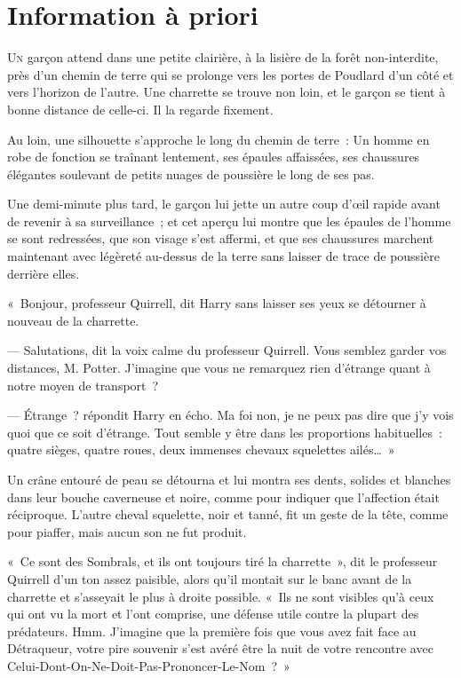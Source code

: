 \chapter{Information à priori}

\lettrine{U}{n} garçon attend dans une petite clairière, à la lisière de la forêt non-interdite, près d'un chemin de terre qui se prolonge vers les portes de Poudlard d'un côté et vers l'horizon de l'autre.
Une charrette se trouve non loin, et le garçon se tient à bonne distance de celle-ci.
Il la regarde fixement.

Au loin, une silhouette s'approche le long du chemin de terre~: Un homme en robe de fonction se traînant lentement, ses épaules affaissées, ses chaussures élégantes soulevant de petits nuages de poussière le long de ses pas.

Une demi-minute plus tard, le garçon lui jette un autre coup d'œil rapide avant de revenir à sa surveillance~; et cet aperçu lui montre que les épaules de l'homme se sont redressées, que son visage s'est affermi, et que ses chaussures marchent maintenant avec légèreté au-dessus de la terre sans laisser de trace de poussière derrière elles.

«~Bonjour, professeur Quirrell, dit Harry sans laisser ses yeux se détourner à nouveau de la charrette.

--- Salutations, dit la voix calme du professeur Quirrell.
Vous semblez garder vos distances, M. Potter.
J'imagine que vous ne remarquez rien d'étrange quant à notre moyen de transport~?

--- Étrange~? répondit Harry en écho.
Ma foi non, je ne peux pas dire que j'y vois quoi que ce soit d'étrange.
Tout semble y être dans les proportions habituelles~: quatre sièges, quatre roues, deux immenses chevaux squelettes ailés…~»

Un crâne entouré de peau se détourna et lui montra ses dents, solides et blanches dans leur bouche caverneuse et noire, comme pour indiquer que l'affection était réciproque.
L'autre cheval squelette, noir et tanné, fit un geste de la tête, comme pour piaffer, mais aucun son ne fut produit.

«~Ce sont des Sombrals, et ils ont toujours tiré la charrette~», dit le professeur Quirrell d'un ton assez paisible, alors qu'il montait sur le banc avant de la charrette et s'asseyait le plus à droite possible.
«~Ils ne sont visibles qu'à ceux qui ont vu la mort et l'ont comprise, une défense utile contre la plupart des prédateurs.
Hmm. J'imagine que la première fois que vous avez fait face au Détraqueur, votre pire souvenir s'est avéré être la nuit de votre rencontre avec Celui-Dont-On-Ne-Doit-Pas-Prononcer-Le-Nom~?~»

